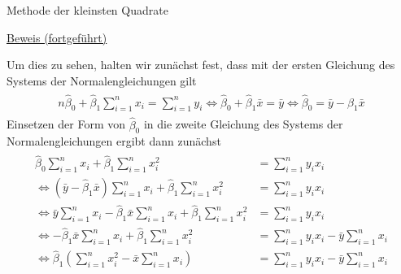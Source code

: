 \documentclass[
  8pt,
  ignorenonframetext,
]{beamer}
\begin{document}
\begin{frame}{Methode der kleinsten Quadrate}
\protect\hypertarget{methode-der-kleinsten-quadrate-10}{}
\tiny
\vspace{2mm}
\setlength{\abovedisplayskip}{3pt}
\setlength{\belowdisplayskip}{3pt}

\underline{Beweis (fortgeführt)}

Um dies zu sehen, halten wir zunächst fest, dass mit der ersten
Gleichung des Systems der Normalengleichungen gilt \begin{align}
\begin{split}
n\hat{\beta}_0 + \hat{\beta}_1 \sum_{i=1}^n x_i          = \sum_{i=1}^n y_i                 
\Leftrightarrow \hat{\beta}_0 + \hat{\beta}_1\bar{x}     = \bar{y}                          
\Leftrightarrow \hat{\beta}_0                            = \bar{y} - \hat{\beta}_1\bar{x}   
\end{split}
\end{align} Einsetzen der Form von \(\hat{\beta}_0\) in die zweite
Gleichung des Systems der Normalengleichungen ergibt dann zunächst
\begin{align}\label{eq:hat_beta_1}
\begin{split}
\hat{\beta}_0 \sum_{i=1}^n x_i + \hat{\beta}_1 \sum_{i=1}^n x_i^2                                         
& = \sum_{i=1}^n y_ix_i   
\\
\Leftrightarrow
\left(\bar{y} - \hat{\beta}_1\bar{x}\right) \sum_{i=1}^n x_i + \hat{\beta}_1 \sum_{i=1}^n x_i^2           
& = \sum_{i=1}^n y_ix_i   
\\
\Leftrightarrow
\bar{y}\sum_{i=1}^n x_i - \hat{\beta}_1\bar{x}\sum_{i=1}^n x_i  + \hat{\beta}_1 \sum_{i=1}^n x_i^2           
& = \sum_{i=1}^n y_ix_i   
\\
\Leftrightarrow
- \hat{\beta}_1\bar{x}\sum_{i=1}^n x_i  + \hat{\beta}_1 \sum_{i=1}^n x_i^2           
& = \sum_{i=1}^n y_ix_i - \bar{y}\sum_{i=1}^n x_i  
\\
\Leftrightarrow
\hat{\beta}_1 \left(\sum_{i=1}^n x_i^2  - \bar{x}\sum_{i=1}^n x_i\right)         
& = \sum_{i=1}^n y_ix_i - \bar{y}\sum_{i=1}^n x_i  
\end{split}
\end{align}
\end{frame}
\end{document}
